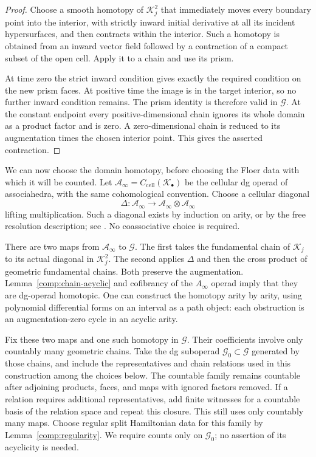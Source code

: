 \documentclass[11pt]{article}
\numberwithin{equation}{section}
\theoremstyle{definition}
\theoremstyle{remark}
\begin{document}
\begin{proof}
Choose a smooth homotopy of $\mathcal K_j^2$ that immediately moves every
boundary point into the interior, with strictly inward initial
derivative at all its incident hypersurfaces, and then contracts
within the interior.  Such a homotopy is obtained from an inward
vector field followed by a contraction of a compact subset of the
open cell.  Apply it to a chain and use its prism.

At time zero the strict inward condition gives exactly the
required condition on the new prism faces.  At positive time the
image is in the target interior, so no further inward condition
remains.  The prism identity is therefore valid in $\mathcal G$.
At the constant endpoint every positive-dimensional chain ignores
its whole domain as a product factor and is zero.  A
zero-dimensional chain is reduced to its augmentation times the
chosen interior point.  This gives the asserted contraction.
\end{proof}

We can now choose the domain homotopy, before choosing the Floer
data with which it will be counted.  Let
$\mathcal A_\infty=C_{\mathrm{cell}}(\mathcal K_\bullet)$ be the cellular
dg operad of associahedra, with the same cohomological convention.
Choose a cellular diagonal
\begin{equation}
 \Delta:\mathcal A_\infty\longrightarrow
             \mathcal A_\infty\otimes\mathcal A_\infty
 \label{comp:cellular-diagonal}
\end{equation}
lifting multiplication.  Such a diagonal exists by induction on
arity, or by the free resolution description; see
\cite{MarklShnider}.  No coassociative choice is required.

There are two maps from $\mathcal A_\infty$ to $\mathcal G$.
The first takes the fundamental chain of $\mathcal K_j$ to its actual
diagonal in $\mathcal K_j^2$.  The second applies $\Delta$ and then the
cross product of geometric fundamental chains.  Both preserve
the augmentation.  Lemma~\ref{comp:chain-acyclic} and cofibrancy
of the $A_\infty$ operad imply that they are dg-operad homotopic.
One can construct the homotopy arity by arity, using polynomial
differential forms on an interval as a path object: each
obstruction is an augmentation-zero cycle in an acyclic arity.

Fix these two maps and one such homotopy in $\mathcal G$.
Their coefficients involve only countably many geometric chains.
Take the dg suboperad $\mathcal G_0\subset\mathcal G$ generated
by those chains, and include the representatives and chain
relations used in this construction among the choices below.
The countable family remains countable after adjoining products,
faces, and maps with ignored factors removed.  If a relation requires
additional representatives, add finite witnesses for a countable
basis of the relation space and repeat this closure.  This still
uses only countably many maps.  Choose regular
split Hamiltonian data for this family by
Lemma~\ref{comp:regularity}.  We require counts only on
$\mathcal G_0$; no assertion of its acyclicity is needed.
\end{document}
